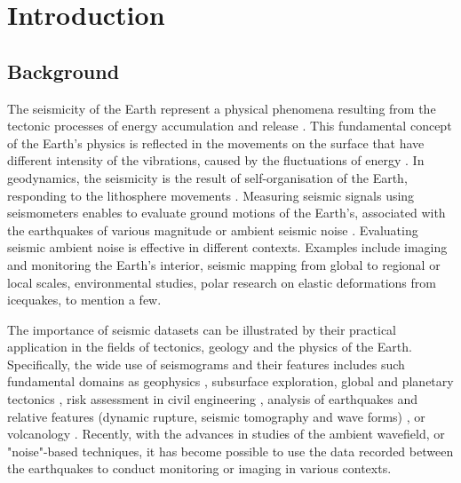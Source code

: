 \documentclass[sensors,article,submit,moreauthors,pdftex]{Definitions/mdpi}
\begin{document}

\section{Introduction}

\subsection{Background}
The seismicity of the Earth represent a physical phenomena resulting from the tectonic processes of energy accumulation and release \cite{GutenbergRichter}. This fundamental concept of the Earth's physics is reflected in the movements on the surface that have different intensity of the vibrations, caused by the fluctuations of energy \cite{Shearer2019}. In geodynamics, the seismicity is the result of self-organisation of the Earth, responding to the lithosphere movements \cite{UdiasBuforn2017}. Measuring seismic signals using seismometers enables to evaluate ground motions of the Earth’s, associated with the earthquakes of various magnitude or ambient seismic noise \cite{nakata_gualtieri_fichtner_2019}. Evaluating seismic ambient noise is effective in different contexts. Examples include imaging and monitoring the Earth’s interior, seismic mapping from global to regional or local scales, environmental studies, polar research on elastic deformations from icequakes, to mention a few.

The importance of seismic datasets can be illustrated by their practical application in the fields of tectonics, geology and the physics of the Earth. Specifically, the wide use of seismograms and their features \cite{Ammon2021} includes such fundamental domains as geophysics \cite{Kulhanek}, subsurface exploration, global and planetary tectonics \citep{Crampin,Jackson2002,Leroyetal2010}, risk assessment in civil engineering \citep{Phillips,Pileckietal2017, Kurzeja}, analysis of earthquakes and relative features (dynamic rupture, seismic tomography and wave forms) \cite{Ahorner,Steinmann,Amorese,Lomnitz,Yuliatmoko}, or volcanology \cite{Pezzo}. Recently, with the advances in studies of the ambient wavefield, or "noise"-based techniques, it has become possible to use the data recorded between the earthquakes to conduct monitoring \cite{Ratdomopurbo,Mordret} or imaging \cite{brenguier2014mapping,Lemenkova202012,Braszusetal2021,Lemenkova202016,Lietal2000} in various contexts. 
\end{document}
